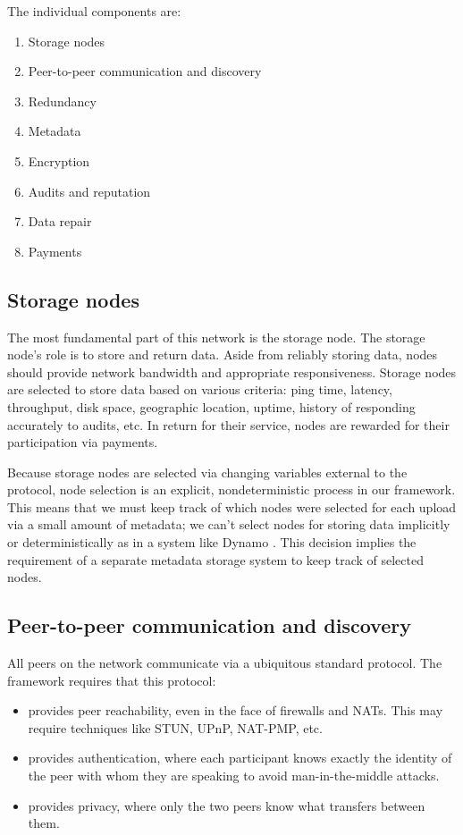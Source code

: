 \documentclass[a4paper,10pt]{article} \usepackage[utf8]{inputenc}
\begin{document}
The individual components are:

\begin{enumerate}
\item Storage nodes
\item Peer-to-peer communication and discovery
\item Redundancy
\item Metadata
\item Encryption
\item Audits and reputation
\item Data repair
\item Payments
\end{enumerate}

\subsection{Storage nodes}

The most fundamental part of this network is the storage node.
The storage node's role is to store and return data.
Aside from reliably storing data, nodes should provide
network bandwidth and appropriate responsiveness.
Storage nodes are selected to store data based on various criteria: ping time,
latency, throughput, disk space, geographic location, uptime, history of
responding accurately to audits, etc.
In return for their service, nodes are rewarded for their participation via
payments.

Because storage
nodes are selected via changing variables external to the protocol, node
selection is an explicit, nondeterministic process in our framework. This means
that we must keep track of which nodes were selected for each upload via a
small amount of metadata; we can't select nodes for storing data implicitly or
deterministically as in a system like Dynamo \cite{dynamo}. This decision
implies the requirement of a separate metadata storage system to keep track
of selected nodes.

\subsection{Peer-to-peer communication and discovery}

All peers on the network communicate via a ubiquitous standard protocol. The
framework requires that this protocol:

\begin{itemize}
\item provides peer reachability, even in the face of firewalls
and NATs. This may require techniques like STUN, UPnP, NAT-PMP, etc.
\item provides authentication, where each participant knows
exactly the identity of the peer with whom they are speaking to avoid
man-in-the-middle attacks.
\item provides privacy, where only the two peers
know what transfers between them.
\end{itemize}
\end{document}
